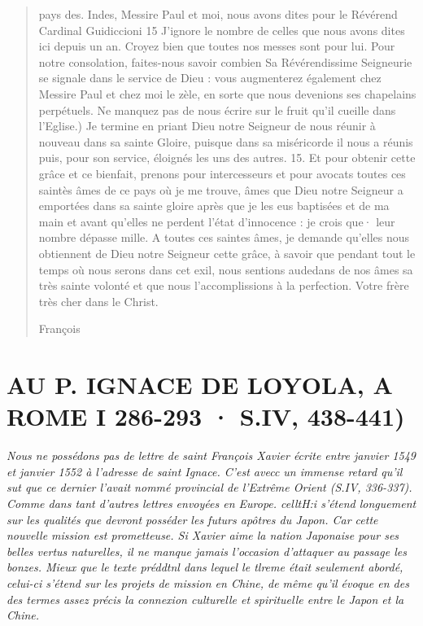 \begin{quote}
pays des. Indes, Messire Paul et moi, nous avons dites pour le Révérend
Cardinal Guidiccioni 15 J'ignore le nombre de celles que
nous avons dites ici depuis un an. Croyez bien que toutes nos messes
sont pour lui. Pour notre consolation, faites-nous savoir combien
Sa Révérendissime Seigneurie se signale dans le service de
Dieu : vous augmenterez également chez Messire Paul et chez moi
le zèle, en sorte que nous devenions ses chapelains perpétuels. Ne
manquez pas de nous écrire sur le fruit qu'il cueille dans l'Eglise.)
Je termine en priant Dieu notre Seigneur de nous réunir à nouveau
dans sa sainte Gloire, puisque dans sa miséricorde il nous a
réunis puis, pour son service, éloignés les uns des autres.
15. Et pour obtenir cette grâce et ce bienfait, prenons pour intercesseurs
et pour avocats toutes ces saintès âmes de ce pays où je
me trouve, âmes que Dieu notre Seigneur a emportées dans sa
sainte gloire après que je les eus baptisées et de ma main et avant
qu'elles ne perdent l'état d'innocence : je crois que· leur nombre
dépasse mille. A toutes ces saintes âmes, je demande qu'elles nous
obtiennent de Dieu notre Seigneur cette grâce, à savoir que pendant
tout le temps où nous serons dans cet exil, nous sentions audedans
de nos âmes sa très sainte volonté et que nous l'accomplissions
à la perfection.
Votre frère très cher dans le Christ.

François
\end{quote}

\section{AU P. IGNACE DE LOYOLA, A ROME
I 286-293 · S.IV, 438-441)}
\textit{Nous ne possédons pas de lettre de saint François Xavier écrite
entre janvier 1549 et janvier 1552 à l'adresse de saint Ignace. C'est
avecc un immense retard qu'il sut que ce dernier l'avait nommé provincial
de l'Extrême Orient (S.IV, 336-337). Comme dans tant
d'autres lettres envoyées en Europe. celltH:i s'étend longuement sur
les qualités que devront posséder les futurs apôtres du Japon. Car
cette nouvelle mission est prometteuse. Si Xavier aime la nation
Japonaise pour ses belles vertus naturelles, il ne manque jamais
l'occasion d'attaquer au passage les bonzes. Mieux que le texte préddtnl
dans lequel le tlreme était seulement abordé, celui-ci s'étend
sur les projets de mission en Chine, de même qu'il évoque en des
des termes assez précis la connexion culturelle et spirituelle entre le
Japon et la Chine.}

